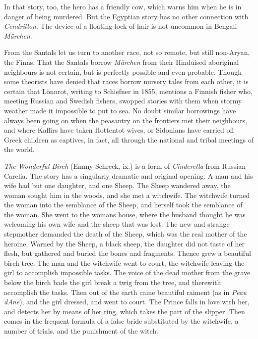 \documentclass[14pt,a4paper]{memoir}
\begin{document}
{In that story, too, the hero has a friendly cow, which warns him when he
is in danger of being murdered. But the Egyptian story has no other
connection with
\emph{Cendrillon}.
The device of a floating lock of hair is not uncommon in Bengali
\emph{Märchen}.

From the Santals let us turn to another race, not so remote, but still
non-Aryan, the
Finns.
That the Santals borrow \emph{Märchen} from their Hinduised aboriginal
neighbours is not certain, but is perfectly possible and even probable.
Though some theorists have denied that races borrow nursery tales from
each other, it is certain that Lönnrot, writing to Schiefner in 1855,
mentions a Finnish fisher who, meeting Russian and Swedish fishers,
\textquotesingle swopped stories\textquotesingle{} with them when stormy
weather made it impossible to put to
sea.
No doubt similar borrowings have always been going on when the peasantry
on the frontiers met their neighbours, and where Kaffirs have taken
Hottentot wives, or Sidonians have carried off Greek children as
captives, in fact, all through the national and tribal meetings of the
world.

\emph{The Wonderful Birch} (Emmy Schreck, ix.) is a form of
\emph{Cinderella} from Russian Carelia. The story has a singularly
dramatic and original opening. A man and his wife had but one daughter,
and one Sheep. The Sheep wandered away, the woman sought him in the
woods, and she met a witchwife. The witchwife turned the woman into the
semblance of the Sheep, and herself took the semblance of the woman. She
went to the woman\textquotesingle s house, where the husband thought he
was welcoming his own wife and the sheep that was lost. The new and
strange stepmother demanded the death of the Sheep, which was the real
mother of the heroine. Warned by the Sheep, a black sheep, the daughter
did not taste of her flesh, but gathered and buried the bones and
fragments. Thence grew a beautiful birch tree. The man and the witchwife
went to court, the witchwife leaving the girl to accomplish impossible
tasks. The voice of the dead mother from the grave below the birch bade
the girl break a twig from the tree, and therewith accomplish the tasks.
Then out of the earth came beautiful raiment (as in \emph{Peau
d\textquotesingle Ane}), and the girl dressed, and went to court. The
Prince falls in love with her, and detects her by means of her ring,
which takes the part of the slipper. Then comes in the frequent formula
of a false bride substituted by the witchwife, a number of trials, and
the punishment of the witch.

}
\end{document}
